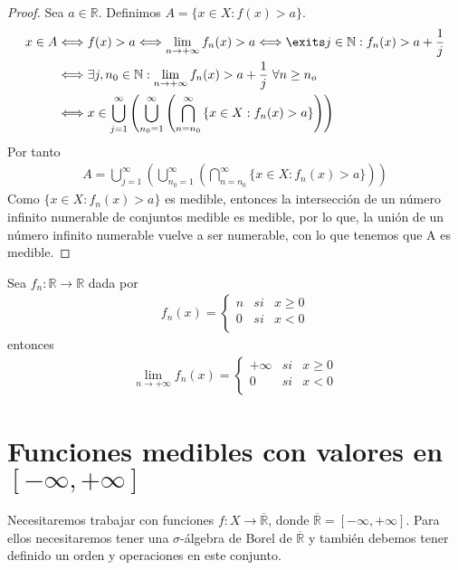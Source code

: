 \begin{proof}
Sea $a \in \mathbb{R}$. Definimos $A = \{ x \in X : f(x) > a\}$.
\\
\newline
\begin{align*}
    x \in A &\Longleftrightarrow f(x) > a \Longleftrightarrow \lim_{n \to +\infty}{f_n(x)} > a \Longleftrightarrow \exits j \in \mathbb{N} : f_n(x) > a + \frac{1}{j}\\
    &\Longleftrightarrow \exists j,n_0 \in \mathbb{N} : \lim_{n \to +\infty}{f_n(x)} > a + \frac{1}{j} \ \forall  n \ge n_o\\
    &\Longleftrightarrow x \in \bigcup_{j=1}^{\infty}{\left( \bigcup_{n_0 = 1}^{\infty}{\left( \bigcap_{n = n_0}^{\infty}{\{ x \in X : f_n(x) > a \}}\right)} \right)}
\end{align*}
Por tanto
\begin{align*}
    A = \bigcup_{j=1}^{\infty}{\left( \bigcup_{n_0 = 1}^{\infty}{\left( \bigcap_{n = n_0}^{\infty}{\{ x \in X : f_n(x) > a \}}\right)} \right)}
\end{align*}
Como $\{ x \in X : f_n(x) > a \}$ es medible, entonces la intersección de un número infinito numerable de conjuntos medible es medible, por lo que, la unión de un número infinito numerable vuelve a ser numerable, con lo que tenemos que A es medible.
\end{proof}
\begin{ejemplo}
Sea $f_n: \mathbb{R} \longrightarrow \mathbb{R}$ dada por
\begin{align*}
    f_n(x) =  \left\{ \begin{array}{lcc}
             n &  si  &x \ge 0\\
             0 &  si  &x <0 \\
             \end{array}
   \right.
\end{align*}
entonces
\begin{align*}
    \lim_{n \to +\infty}{f_n(x)} =  \left\{ \begin{array}{lcc}
             +\infty &  si  &x \ge 0\\
             0 &  si  &x <0 \\
             \end{array}
   \right.
\end{align*}
\end{ejemplo}
\section{Funciones medibles con valores en $[-\infty, +\infty]$}
Necesitaremos trabajar con funciones $f: X \longrightarrow \overline{\mathbb{R}}$, donde $\overline{\mathbb{R}} = [-\infty, +\infty]$. Para ellos necesitaremos tener una $\sigma$-álgebra de Borel de $\overline{\mathbb{R}}$ y también debemos tener definido un orden y operaciones en este conjunto.

